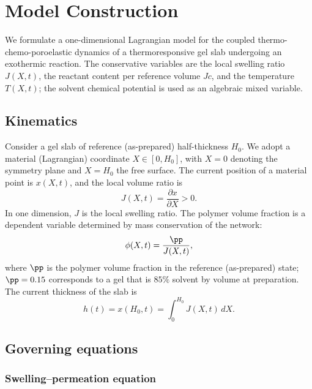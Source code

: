 \appendix

\section{Model Construction}
\label{app:model}

We formulate a one-dimensional Lagrangian model for the coupled thermo-chemo-poroelastic dynamics of a thermoresponsive gel slab undergoing an exothermic reaction. The conservative variables are the local swelling ratio $J(X,t)$, the reactant content per reference volume $Jc$, and the temperature $T(X,t)$; the solvent chemical potential is used as an algebraic mixed variable.

\subsection{Kinematics}

Consider a gel slab of reference (as-prepared) half-thickness $H_0$. We adopt a material (Lagrangian) coordinate $X\in[0,H_0]$, with $X=0$ denoting the symmetry plane and $X=H_0$ the free surface. The current position of a material point is $x(X,t)$, and the local volume ratio is
\begin{equation}
  J(X,t) = \frac{\partial x}{\partial X} > 0.
  \label{eq:J_def}
\end{equation}
In one dimension, $J$ is the local swelling ratio. The polymer volume fraction is a dependent variable determined by mass conservation of the network:
\begin{equation}
  \phi(X,t) = \frac{\pp}{J(X,t)},
  \label{eq:phi_J}
\end{equation}
where $\pp$ is the polymer volume fraction in the reference (as-prepared) state; $\pp=0.15$ corresponds to a gel that is $85\%$ solvent by volume at preparation. The current thickness of the slab is
\begin{equation}
  h(t) = x(H_0,t) = \int_0^{H_0} J(X,t)\,dX.
  \label{eq:thickness}
\end{equation}

\subsection{Governing equations}

\subsubsection{Swelling--permeation equation}

